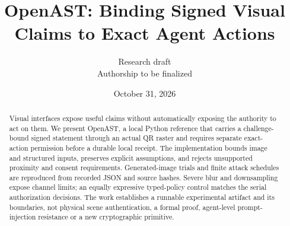 \documentclass[letterpaper,twocolumn,10pt]{article}
\title{OpenAST: Binding Signed Visual Claims to Exact Agent Actions}
\author{Research draft\\Authorship to be finalized}
\date{October 31, 2026}
\begin{document}
\raggedbottom
\maketitle
\begin{abstract}
Visual interfaces expose useful claims without automatically exposing the authority to act on them. We present OpenAST, a local Python reference that carries a challenge-bound signed statement through an actual QR raster and requires separate exact-action permission before a durable local receipt. The implementation bounds image and structured inputs, preserves explicit assumptions, and rejects unsupported proximity and consent requirements. Generated-image trials and finite attack schedules are reproduced from recorded JSON and source hashes. Severe blur and downsampling expose channel limits; an equally expressive typed-policy control matches the serial authorization decisions. The work establishes a runnable experimental artifact and its boundaries, not physical scene authentication, a formal proof, agent-level prompt-injection resistance or a new cryptographic primitive.
\end{abstract}








\appendix

\end{document}
